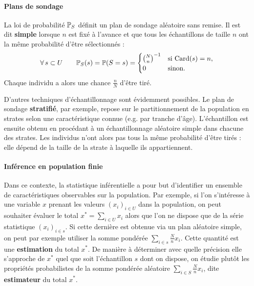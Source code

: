 \paragraph{Plans de sondage} La loi de probabilité $\mathbb{P}_S$ définit un plan de sondage aléatoire sans remise. Il est dit \textbf{simple} lorsque $n$ est fixé à l'avance et que tous les échantillons de taille $n$ ont la même probabilité d'être sélectionnés : $$\forall\,s\subset U\qquad \mathbb{P}_S(s) = \mathbb{P}(S=s) = \begin{cases} \binom{N}{n}^{-1} & \text{si } \text{Card}(s) = n,\\ 0 & \text{sinon.} \end{cases}$$ Chaque individu a alors une chance $\frac{n}{N}$ d'être tiré.

D'autres techniques d'échantillonnage sont évidemment possibles. Le plan de sondage \textbf{stratifié}, par exemple, repose sur le partitionnement de la population en strates selon
une caractéristique connue (e.g. par tranche d'âge). L'échantillon est
ensuite obtenu en procédant à un échantillonnage aléatoire simple dans chacune des strates. Les individus n'ont alors pas tous la même probabilité d'être tirés : elle dépend de la taille de la strate à laquelle ils appartiennent.

\paragraph{Inférence en population finie}
Dans ce contexte, la statistique inférentielle a pour but d'identifier un ensemble de caractéristiques observables sur la population. Par exemple, si l'on s'intéresse à une variable $x$ prenant les valeurs $(x_i)_{i\in U}$ dans la population, on peut souhaiter évaluer le total $x^* = \sum_{i\in U} x_i$ alors que l'on ne dispose que de la série statistique $(x_i)_{i\in s}$. Si cette dernière est obtenue via un plan aléatoire simple, on peut par exemple utiliser la somme pondérée $\sum_{i \in s} \frac{N}{n} x_i$. Cette quantité est une \textbf{estimation} du total $x^*$. De manière à déterminer avec quelle précision elle s'approche de $x^*$ quel que soit l'échantillon $s$ dont on dispose, on étudie plutôt les propriétés probabilistes de la somme pondérée aléatoire $\sum_{i \in S} \frac{N}{n} x_i$, dite \textbf{estimateur} du total $x^*$.

